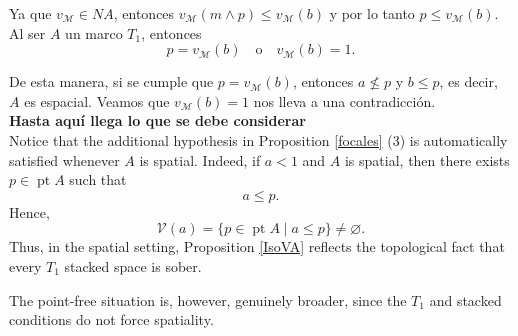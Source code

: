\documentclass[11pt]{amsart}
\DeclareMathOperator{\pt}{pt}
\theoremstyle{plain}
\theoremstyle{definition}
\begin{document}
Ya que $v_\mathcal{M}\in NA$, entonces $v_\mathcal{M}(m\wedge p)\leq v_\mathcal{M}(b)$ y por lo tanto $p\leq v_\mathcal{M}(b)$. Al ser $A$ un marco $T_1$, entonces
\[
p=v_\mathcal{M}(b)\quad \text{o}\quad v_\mathcal{M}(b)=1.
\]

De esta manera, si se cumple que $p=v_\mathcal{M}(b)$, entonces $a\nleq p$ y $b\leq p$, es decir, $A$ es espacial. Veamos que $v_\mathcal{M}(b)=1$ nos lleva a una contradicción.\\

\textbf{Hasta aquí llega lo que se debe considerar}\\

Notice that the additional hypothesis in Proposition \ref{focales} (3) is automatically
satisfied whenever $A$ is spatial. Indeed, if $a<1$ and $A$ is spatial, then
there exists $p\in\pt A$ such that
\[
a\leq p.
\]
Hence,
\[
\mathcal{V}(a)=\{p\in\pt A\mid a\leq p\}\neq\varnothing.
\]
Thus, in the spatial setting, Proposition \ref{IsoVA} reflects the topological fact
that every $T_1$ stacked space is sober.

The point-free situation is, however, genuinely broader, since the $T_1$ and
stacked conditions do not force spatiality.
\end{document}
